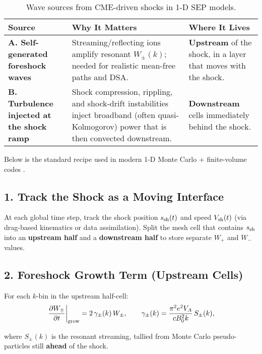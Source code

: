 \begin{table}[H]
\centering
\renewcommand{\arraystretch}{1.4}
\begin{tabularx}{\textwidth}{|X|X|X|}
\hline
\textbf{Source} & \textbf{Why It Matters} & \textbf{Where It Lives} \\
\hline
\textbf{A. Self-generated foreshock waves} & Streaming/reflecting ions amplify resonant $W_\pm(k)$; needed for realistic mean-free paths and DSA. & \textbf{Upstream} of the shock, in a layer that moves with the shock. \\
\hline
\textbf{B. Turbulence injected at the shock ramp} & Shock compression, rippling, and shock-drift instabilities inject broadband (often quasi-Kolmogorov) power that is then convected downstream. & \textbf{Downstream} cells immediately behind the shock. \\
\hline
\end{tabularx}
\caption{Wave sources from CME-driven shocks in 1-D SEP models.}
\end{table}

Below is the standard recipe used in modern 1-D Monte Carlo + finite-volume codes \cite{Zank2000, Afanasiev2015, Strauss2017}.

\subsection*{1. Track the Shock as a Moving Interface}

At each global time step, track the shock position $s_{\rm sh}(t)$ and speed $V_{\rm sh}(t)$ (via drag-based kinematics or data assimilation).  
Split the mesh cell that contains $s_{\rm sh}$ into an \textbf{upstream half} and a \textbf{downstream half} to store separate $W_+$ and $W_-$ values.

\subsection*{2. Foreshock Growth Term (Upstream Cells)}

For each $k$-bin in the upstream half-cell:
\begin{equation}
\left. \frac{\partial W_\pm}{\partial t} \right|_{\rm grow}
= 2\,\gamma_\pm(k)\,W_\pm,
\qquad
\gamma_\pm(k) = \frac{\pi^2 e^2 V_A}{c B_0^2 k}\,S_\pm(k),
\end{equation}

where $S_\pm(k)$ is the resonant streaming, tallied from Monte Carlo pseudo-particles still \textbf{ahead} of the shock.

